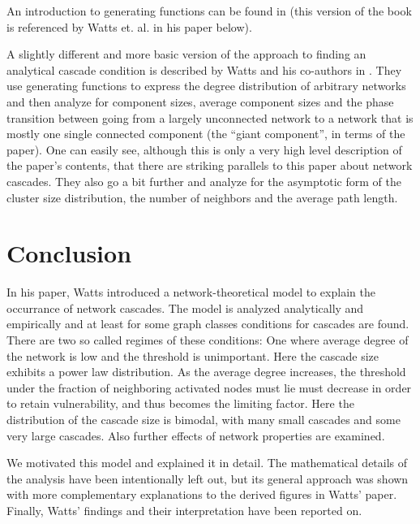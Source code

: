 \documentclass{sig-alternate-05-2015}
\begin{document}
An introduction to generating functions can be found in \cite{wilf1994generatingfunctionology} (this version of the book is referenced by Watts et. al. in his paper below).

A slightly different and more basic version of the approach to finding an analytical cascade condition is described by Watts and his co-authors in \cite{newman2001random}. They use generating functions to express the degree distribution of arbitrary networks and then analyze for component sizes, average component sizes and the phase transition between going from a largely unconnected network to a network that is mostly one single connected component (the ``giant component'', in terms of the paper). One can easily see, although this is only a very high level description of the paper's contents, that there are striking parallels to this paper about network cascades. They also go a bit further and analyze for the asymptotic form of the cluster size distribution, the number of neighbors and the average path length.


\section{Conclusion}\label{sec:summary}

In his paper, Watts introduced a network-theoretical model to explain the occurrance of network cascades. The model is analyzed analytically and empirically and at least for some graph classes conditions for cascades are found. There are two so called regimes of these conditions: One where average degree of the network is low and the threshold is unimportant. Here the cascade size exhibits a power law distribution. As the average degree increases, the threshold under the fraction of neighboring activated nodes must lie must decrease in order to retain vulnerability, and thus becomes the limiting factor. Here the distribution of the cascade size is bimodal, with many small cascades and some very large cascades. Also further effects of network properties are examined.

We motivated this model and explained it in detail. The mathematical details of the analysis have been intentionally left out, but its general approach was shown with more complementary explanations to the derived figures in Watts' paper. Finally, Watts' findings and their interpretation have been reported on.




\end{document}
